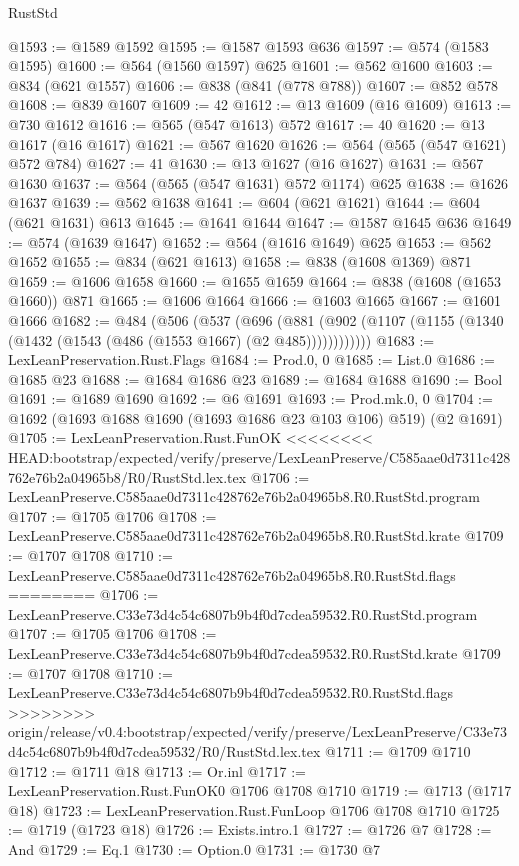 \begin{lexlean}{RustStd}
\begin{coremodule}
{\begin{coremodule}
{{{{{{{{{{{{{@1593 := @1589 @1592
@1595 := @1587 @1593 @636
@1597 := @574 (@1583 @1595)
@1600 := @564 (@1560 @1597) @625
@1601 := @562 @1600
@1603 := @834 (@621 @1557)
@1606 := @838 (@841 (@778 @788))
@1607 := @852 @578
@1608 := @839 @1607
@1609 := 42
@1612 := @13 @1609 (@16 @1609)
@1613 := @730 @1612
@1616 := @565 (@547 @1613) @572
@1617 := 40
@1620 := @13 @1617 (@16 @1617)
@1621 := @567 @1620
@1626 := @564 (@565 (@547 @1621) @572 @784)
@1627 := 41
@1630 := @13 @1627 (@16 @1627)
@1631 := @567 @1630
@1637 := @564 (@565 (@547 @1631) @572 @1174) @625
@1638 := @1626 @1637
@1639 := @562 @1638
@1641 := @604 (@621 @1621)
@1644 := @604 (@621 @1631) @613
@1645 := @1641 @1644
@1647 := @1587 @1645 @636
@1649 := @574 (@1639 @1647)
@1652 := @564 (@1616 @1649) @625
@1653 := @562 @1652
@1655 := @834 (@621 @1613)
@1658 := @838 (@1608 @1369) @871
@1659 := @1606 @1658
@1660 := @1655 @1659
@1664 := @838 (@1608 (@1653 @1660)) @871
@1665 := @1606 @1664
@1666 := @1603 @1665
@1667 := @1601 @1666
@1682 := @484
    (@506
      (@537
        (@696
          (@881 (@902 (@1107 (@1155 (@1340 (@1432 (@1543 (@486 (@1553 @1667) (@2 @485))))))))))))
@1683 := LexLeanPreservation.Rust.Flags
@1684 := Prod.{0, 0}
@1685 := List.{0}
@1686 := @1685 @23
@1688 := @1684 @1686 @23
@1689 := @1684 @1688
@1690 := Bool
@1691 := @1689 @1690
@1692 := @6 @1691
@1693 := Prod.mk.{0, 0}
@1704 := @1692 (@1693 @1688 @1690 (@1693 @1686 @23 @103 @106) @519) (@2 @1691)
@1705 := LexLeanPreservation.Rust.FunOK
<<<<<<<< HEAD:bootstrap/expected/verify/preserve/LexLeanPreserve/C585aae0d7311c428762e76b2a04965b8/R0/RustStd.lex.tex
@1706 := LexLeanPreserve.C585aae0d7311c428762e76b2a04965b8.R0.RustStd.program
@1707 := @1705 @1706
@1708 := LexLeanPreserve.C585aae0d7311c428762e76b2a04965b8.R0.RustStd.krate
@1709 := @1707 @1708
@1710 := LexLeanPreserve.C585aae0d7311c428762e76b2a04965b8.R0.RustStd.flags
========
@1706 := LexLeanPreserve.C33e73d4c54c6807b9b4f0d7cdea59532.R0.RustStd.program
@1707 := @1705 @1706
@1708 := LexLeanPreserve.C33e73d4c54c6807b9b4f0d7cdea59532.R0.RustStd.krate
@1709 := @1707 @1708
@1710 := LexLeanPreserve.C33e73d4c54c6807b9b4f0d7cdea59532.R0.RustStd.flags
>>>>>>>> origin/release/v0.4:bootstrap/expected/verify/preserve/LexLeanPreserve/C33e73d4c54c6807b9b4f0d7cdea59532/R0/RustStd.lex.tex
@1711 := @1709 @1710
@1712 := @1711 @18
@1713 := Or.inl
@1717 := LexLeanPreservation.Rust.FunOK0 @1706 @1708 @1710
@1719 := @1713 (@1717 @18)
@1723 := LexLeanPreservation.Rust.FunLoop @1706 @1708 @1710
@1725 := @1719 (@1723 @18)
@1726 := Exists.intro.{1}
@1727 := @1726 @7
@1728 := And
@1729 := Eq.{1}
@1730 := Option.{0}
@1731 := @1730 @7
}}}}}}}}}}}}}
\end{coremodule}}
\end{coremodule}
\end{lexlean}
